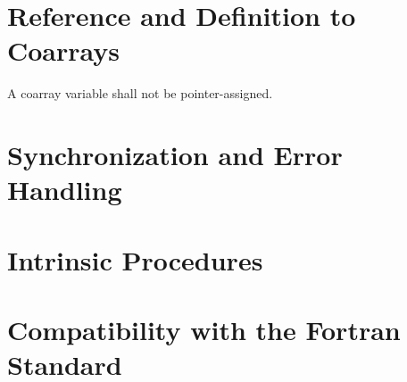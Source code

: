 \section{Reference and Definition to Coarrays}
\label{sec:Reference and Definition to Coarrays}

\begin{Constraints C}
\item A coarray variable shall not be pointer-assigned.
\end{Constraints C}

\section{Synchronization and Error Handling}
\label{sec:Synchronization and Error Handling}

\section{Intrinsic Procedures}
\label{sec:Intrinsic Procedures}

\section{Compatibility with the Fortran Standard}
\label{sec:Compatibility with the Fortran Standard}

